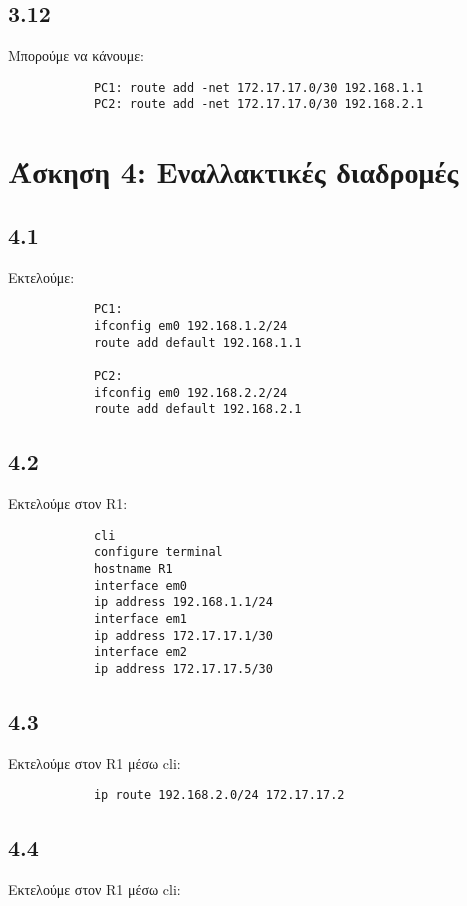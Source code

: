 \documentclass[a4paper, 12pt]{article}
\begin{document}
	\subsection*{3.12}
		Μπορούμε να κάνουμε: 
		
		\begin{verbatim}
			PC1: route add -net 172.17.17.0/30 192.168.1.1
			PC2: route add -net 172.17.17.0/30 192.168.2.1
		\end{verbatim}

\section*{Άσκηση 4: Εναλλακτικές διαδρομές}

	\subsection*{4.1}
		Εκτελούμε:
		
		\begin{verbatim}
			PC1: 
			ifconfig em0 192.168.1.2/24
			route add default 192.168.1.1
			
			PC2: 
			ifconfig em0 192.168.2.2/24
			route add default 192.168.2.1
		\end{verbatim}
				
	\subsection*{4.2}
		Εκτελούμε στον R1:
		
		\begin{verbatim}
			cli
			configure terminal
			hostname R1
			interface em0
			ip address 192.168.1.1/24
			interface em1
			ip address 172.17.17.1/30
			interface em2
			ip address 172.17.17.5/30
		\end{verbatim}

	\subsection*{4.3}
		Εκτελούμε στον R1 μέσω cli:
		
		\begin{verbatim}
			ip route 192.168.2.0/24 172.17.17.2
		\end{verbatim}		

	\subsection*{4.4}
		Εκτελούμε στον R1 μέσω cli:
		
\end{document}
